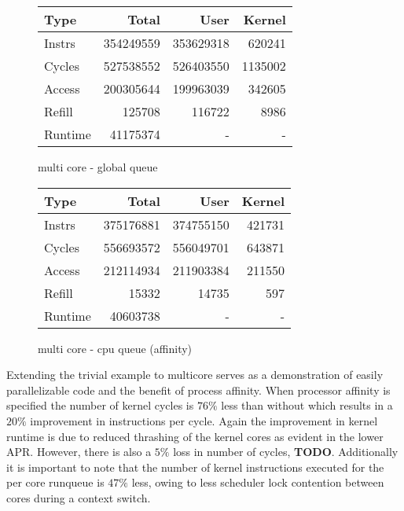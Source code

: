 \documentclass[11pt]{article}
\begin{document}
\begin{figure*}[h]
	\centering
	\begin{subtable}{.48\linewidth}
		\centering
		\begin{tabular}{ l|rrr }
			Type    & Total     & User      & Kernel  \\
			\hline
			Instrs  & 354249559 & 353629318 & 620241  \\ 
			Cycles  & 527538552 & 526403550 & 1135002 \\ 
			Access  & 200305644 & 199963039 & 342605  \\ 
			Refill  & 125708    & 116722    & 8986    \\ 
			Runtime & 41175374  & -         & -       \\ 
			\hline
		\end{tabular}
		\caption{multi core - global queue}
	\end{subtable}
	\begin{subtable}{.48\linewidth} 
		\centering        
		\begin{tabular}{ l|rrr }
			Type    & Total     & User      & Kernel \\
			\hline
			Instrs  & 375176881 & 374755150 & 421731 \\ 
			Cycles  & 556693572 & 556049701 & 643871 \\ 
			Access  & 212114934 & 211903384 & 211550 \\ 
			Refill  & 15332     & 14735     & 597    \\ 
			Runtime & 40603738  & -         & -      \\ 
			\hline
		\end{tabular}
		\caption{multi core - cpu queue (affinity)}    
	\end{subtable}
\end{figure*}

Extending the trivial example to multicore serves as a demonstration of easily parallelizable code and the benefit of process affinity.  When processor affinity is specified the number of kernel cycles is $76\%$ less than without which results in a $20\%$ improvement in instructions per cycle.  Again the improvement in kernel runtime is due to reduced thrashing of the kernel cores as evident in the lower APR.  However, there is also a $5\%$ loss in number of cycles, \textbf{TODO}.  Additionally it is important to note that the number of kernel instructions executed for the per core runqueue is $47\%$ less, owing to less scheduler lock contention between cores during a context switch.
\end{document}
